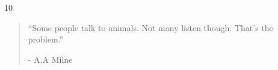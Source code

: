 \documentclass[smalldemyvopaper,11pt,twoside,onecolumn,openright,extrafontsizes]{memoir}
\begin{document}
\frontmatter
\pagestyle{mystyle}

%


%
%





\clearpage
\tableofcontents*

\clearpage


	

\clearpage



\clearpage

\vspace*{4.3cm}
\begin{localsize}{10}
  \begin{quote}
    “Some people talk to animals. Not many listen though. That's the problem.”
    \begin{flushright}- A.A Milne \end{flushright}
  \end{quote} 
\end{localsize}
\vspace{1cm}
\end{document}
